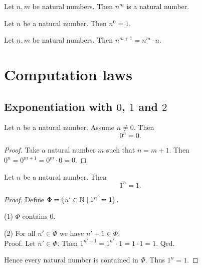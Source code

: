 \documentclass[../arithmetic.tex]{subfiles}
\begin{document}
  \begin{forthel}
    \begin{lemma}
      Let $n, m$ be natural numbers.
      Then $n^{m}$ is a natural number.
    \end{lemma}
  \end{forthel}

  \begin{forthel}
    \begin{lemma}
      Let $n$ be a natural number.
      Then $n^{0} = 1$.
    \end{lemma}
  \end{forthel}

  \begin{forthel}
    \begin{lemma}
      Let $n, m$ be natural numbers.
      Then $n^{m + 1} = n^{m} \cdot n$.
    \end{lemma}
  \end{forthel}


  \section{Computation laws}

  \subsection*{Exponentiation with $0$, $1$ and $2$}

  \begin{forthel}
    \begin{proposition}
      Let $n$ be a natural number.
      Assume $n \neq 0$.
      Then \[ 0^{n} = 0. \]
    \end{proposition}
    \begin{proof}
      Take a natural number $m$ such that $n = m + 1$.
      Then $0^{n}
        = 0^{m + 1}
        = 0^{m} \cdot 0
        = 0$.
    \end{proof}
  \end{forthel}

  \begin{forthel}
    \begin{proposition}
      Let $n$ be a natural number.
      Then \[ 1^{n} = 1. \]
    \end{proposition}
    \begin{proof}
      Define $\Phi = \{ n' \in \mathbb{N} \mid 1^{n'} = 1 \}$.

      (1) $\Phi$ contains $0$.

      (2) For all $n' \in \Phi$ we have $n' + 1 \in \Phi$. \\
      Proof.
        Let $n' \in \Phi$.
        Then $1^{n' + 1}
          = 1^{n'} \cdot 1
          = 1 \cdot 1
          = 1$.
      Qed.

      Hence every natural number is contained in $\Phi$.
      Thus $1^{n} = 1$.
    \end{proof}
  \end{forthel}
\end{document}

